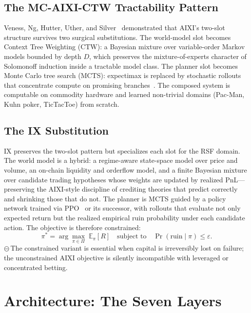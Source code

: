 \documentclass[conference,10pt,letterpaper]{IEEEtran}
\newcommand{\EP}{\textcolor{black}{\ensuremath{\circleddash}}\,}     %
\begin{document}
\subsection{The MC-AIXI-CTW Tractability Pattern}

Veness, Ng, Hutter, Uther, and Silver~\cite{veness2011monte} demonstrated
that AIXI's two-slot structure survives two surgical substitutions. The
world-model slot becomes Context Tree Weighting (CTW): a Bayesian mixture
over variable-order Markov models bounded by depth $D$, which preserves the
mixture-of-experts character of Solomonoff induction inside a tractable model
class. The planner slot becomes Monte Carlo tree search (MCTS): expectimax
is replaced by stochastic rollouts that concentrate compute on promising
branches~\cite{silver2016mastering}. The composed system is computable on
commodity hardware and learned non-trivial domains (Pac-Man, Kuhn poker,
TicTacToe) from scratch.

\subsection{The IX Substitution}

IX preserves the two-slot pattern but specializes each slot for the RSF
domain. The world model is a hybrid: a regime-aware state-space model over
price and volume, an on-chain liquidity and orderflow model, and a finite
Bayesian mixture over candidate trading hypotheses whose weights are updated
by realized PnL---preserving the AIXI-style discipline of crediting theories
that predict correctly and shrinking those that do not. The planner is MCTS
guided by a policy network trained via PPO~\cite{schulman2017proximal} or
its successor, with rollouts that evaluate not only expected return but the
realized empirical ruin probability under each candidate action. The
objective is therefore constrained:
%
\begin{equation}
\pi^{*} = \arg\max_{\pi \in \Pi}\; \mathbb{E}_{\pi}[R]
\quad \text{subject to} \quad
\Pr(\text{ruin} \mid \pi) \leq \varepsilon.
\label{eq:objective}
\end{equation}
%
\EP{}The constrained variant is essential when capital is irreversibly lost
on failure; the unconstrained AIXI objective is silently incompatible with
leveraged or concentrated betting.

\section{Architecture: The Seven Layers}
\end{document}
